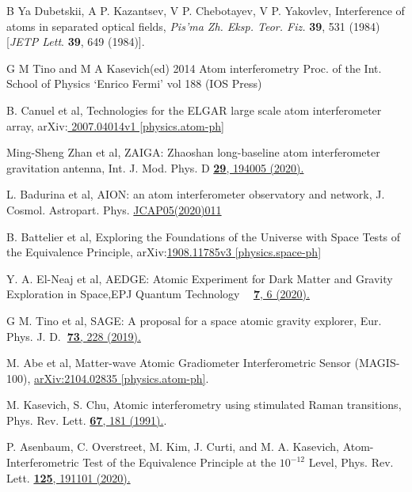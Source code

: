 \documentclass[twocolumn,showpacs,preprintnumbers]{revtex4}
\begin{document}
\begin{thebibliography}{99}
 B Ya Dubetskii, A P. Kazantsev, V P. Chebotayev, V P. Yakovlev,
Interference of atoms in separated optical fields, \textit{Pis'ma Zh. Eksp.
Teor. Fiz.} \textbf{39}, 531 (1984) [\textit{JETP Lett}. \textbf{39}, 649
(1984)].

 G M Tino and M A Kasevich(ed) 2014 Atom interferometry Proc.
of the Int. School of Physics `Enrico Fermi' vol 188 (IOS Press)

 B. Canuel et al, Technologies for the ELGAR large scale atom
interferometer array, arXiv:\href{https://arxiv.org/abs/2007.04014}{%
2007.04014v1 [physics.atom-ph]}

 Ming-Sheng Zhan et al, ZAIGA: Zhaoshan long-baseline atom
interferometer gravitation antenna, Int. J. Mod. Phys. D \href{https://doi.org/10.1142/S0218271819400054}%
{\textbf{29}, 194005 (2020).}

 L. Badurina et al, AION: an atom interferometer observatory
and network, J. Cosmol. Astropart. Phys. \href{https://doi.org/10.1088/1475-7516/2020/05/011}%
{JCAP05(2020)011}

 B. Battelier et al, Exploring the Foundations of the Universe
with Space Tests of the Equivalence Principle, arXiv:\href{https://arxiv.org/abs/1908.11785}%
{1908.11785v3 [physics.space-ph]}

 Y. A. El-Neaj et al, AEDGE: Atomic Experiment for Dark
Matter and Gravity Exploration in Space,EPJ Quantum Technology \textbf{\ } 
\href{https://doi.org/10.1140/epjqt/s40507-020-0080-0}{\textbf{7}, 6 (2020).}

 G M. Tino et al, SAGE: A proposal for a space atomic
gravity explorer, Eur. Phys. J. D.\textbf{\ }\href{https://doi.org/10.1140/epjd/e2019-100324-6}%
{\textbf{73}, 228 (2019).}

 M. Abe et al, Matter-wave Atomic Gradiometer
Interferometric Sensor (MAGIS-100), \href{https://arxiv.org/abs/2104.02835}{%
arXiv:2104.02835 [physics.atom-ph]}.

 M. Kasevich, S. Chu, Atomic interferometry using stimulated
Raman transitions, Phys. Rev. Lett. \href{https://doi.org/10.1103/PhysRevLett.67.181}%
{\textbf{67}, 181 (1991).}.

 P. Asenbaum, C. Overstreet, M. Kim, J. Curti, and M. A.
Kasevich, Atom-Interferometric Test of the Equivalence Principle at the $%
10^{-12}$ Level, Phys. Rev. Lett. \href{https://doi.org/10.1103/PhysRevLett.125.191101}%
{\textbf{125}, 191101 (2020).}


\end{thebibliography}
\end{document}
